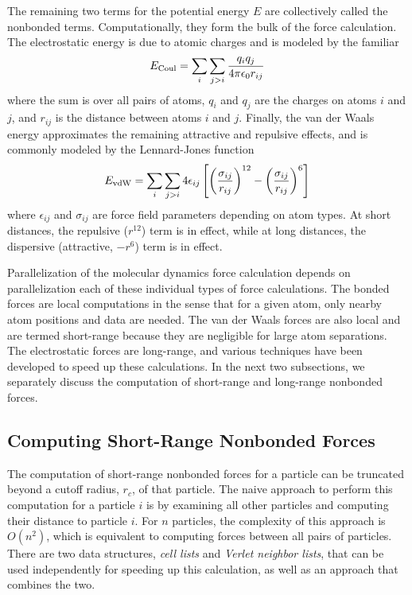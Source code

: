 The remaining two terms for the potential energy $E$
are collectively called the nonbonded terms.
Computationally, they form the bulk of the force calculation.
The electrostatic energy is due to atomic charges and is modeled
by the familiar
\[
E_{\rm Coul} = \sum_{i} \sum_{j>i} \frac{q_i q_j}{4 \pi \epsilon_0 r_{ij}}
\]
where the sum is over all pairs of atoms, $q_i$ and $q_j$ are the
charges on atoms $i$ and $j$, and $r_{ij}$ is the distance
between atoms $i$ and $j$.  Finally, the van der Waals energy
approximates the remaining attractive and repulsive effects, and is commonly
modeled by the Lennard-Jones function
\[
E_{\rm vdW} = \sum_{i} \sum_{j>i} 4 \epsilon_{ij} \left[ 
   \left( \frac{\sigma_{ij}}{r_{ij}} \right)^{12} -
   \left( \frac{\sigma_{ij}}{r_{ij}} \right)^{6} \right]
\]
where $\epsilon_{ij}$ and $\sigma_{ij}$ are force field parameters depending
on atom types.  At short distances, the repulsive ($r^{12}$) term is in 
effect, while at long distances, the dispersive (attractive, $-r^6$) term is in 
effect.

Parallelization of the molecular dynamics force calculation depends on
parallelization each of these individual types of force calculations.
The bonded forces are local computations in the sense that for a given
atom, only nearby atom positions and data are needed.  The van
der Waals forces are also local and are termed short-range because they
are negligible for large atom separations.  The electrostatic forces
are long-range, and various techniques have been developed to speed up
these calculations.  In the next two subsections, we separately discuss the
computation of short-range and long-range nonbonded forces.

\subsection{Computing Short-Range Nonbonded Forces}

The computation of short-range nonbonded forces for a particle can be
truncated beyond a cutoff radius, $r_c$, of that particle.  The naive
approach to perform this computation for a particle $i$ is by examining
all other particles and computing their distance to particle $i$.
For $n$ particles, the complexity of this approach is $O(n^2)$, which is
equivalent to computing forces between all pairs of particles.  There are
two data structures, {\em cell lists} and {\em Verlet neighbor lists},
that can be used independently for speeding up this calculation, as well
as an approach that combines the two.

